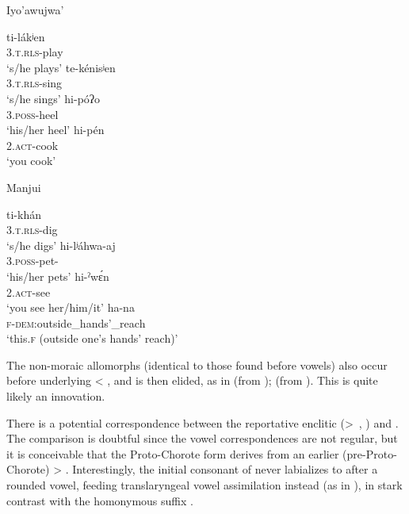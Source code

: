 \ea\label{ex:syllc:i'w}
Iyo'awujwa' \citep[66, 74, 75]{AG83}
    \begin{xlist}
        \ex \gll ti-lákʲen\\
             3.\textsc{t.rls}-play\\
             \glt `s/he plays'
        \ex \gll te-kénisʲen\\
             3.\textsc{t.rls}-sing\\
             \glt `s/he sings'
        \ex\gll hi-póʔo\\
            3.{\textsc{poss}}-heel\\
            \glt `his/her heel'
        \ex\gll hi-pén\\
            2.{\textsc{act}}-cook\\
            \glt `you cook'
    \end{xlist}
\z

\ea\label{ex:syllc:mj}
Manjui \citep{JC18}
    \begin{xlist}
        \ex \gll ti-khán\\
             3.\textsc{t.rls}-dig\\
             \glt `s/he digs'
        \ex\gll hi-lʲáhwa-aj\\
            3.{\textsc{poss}}-pet-\PL\\
            \glt `his/her pets'
        \ex\gll hi-ˀwɛ́n\\
            2.{\textsc{act}}-see\\
            \glt `you see her/him/it'
        \ex\gll ha-na\\
            {\textsc{f}}-{\textsc{dem}}:outside\_hands'\_reach\\
            \glt `this.\textsc{f} (outside one’s hands’ reach)'
    \end{xlist}
\z

The non-moraic allomorphs (identical to those found before vowels) also occur before underlying  < , and  is then elided, as in  (from );  (from ). This is quite likely an innovation.

There is a potential correspondence between the reportative enclitic  (>~, ) and . The comparison is doubtful since the vowel correspondences are not regular, but it is conceivable that the Proto-Chorote form derives from an earlier (pre-Proto-Chorote)  > . Interestingly, the initial consonant of  never labializes to  after a rounded vowel, feeding translaryngeal vowel assimilation instead (as in ), in stark contrast with the homonymous suffix .

